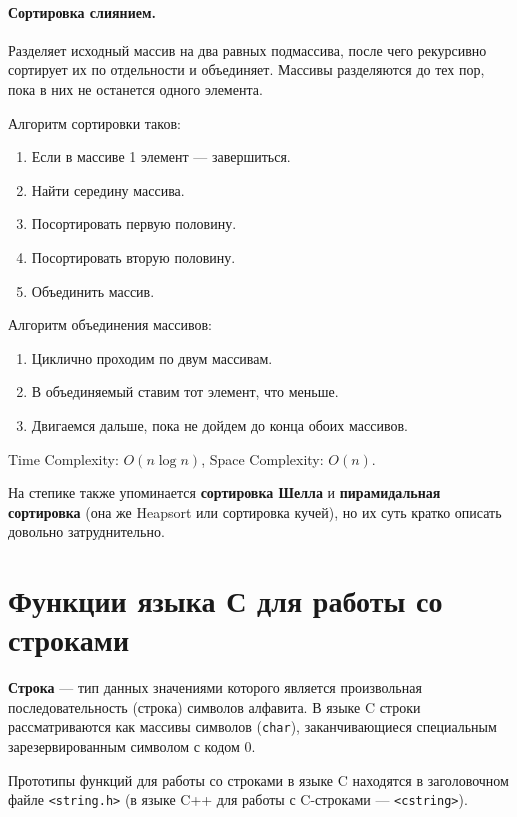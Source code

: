 \paragraph{Сортировка слиянием.}
Разделяет исходный массив на два равных подмассива, после чего рекурсивно сортирует их по отдельности и объединяет.
Массивы разделяются до тех пор, пока в них не останется одного элемента.

Алгоритм сортировки таков:
\begin{enumerate}
  \item Если в массиве 1 элемент --- завершиться.
  \item Найти середину массива.
  \item Посортировать первую половину.
  \item Посортировать вторую половину.
  \item Объединить массив.
\end{enumerate}

Алгоритм объединения массивов:
\begin{enumerate}
  \item Циклично проходим по двум массивам.
  \item В объединяемый ставим тот элемент, что меньше.
  \item Двигаемся дальше, пока не дойдем до конца обоих массивов.
\end{enumerate}

Time Complexity: $O(n\log n)$, Space Complexity: $O(n)$.

{\small На степике также упоминается \textbf{сортировка Шелла} и \textbf{пирамидальная сортировка}
(она же Heapsort или сортировка кучей), но их суть кратко описать довольно затруднительно.}

\section{Функции языка С для работы со строками}
\textbf{Строка} --- тип данных значениями которого является произвольная последовательность (строка)
символов алфавита.
В языке C строки рассматриваются как массивы символов (\verb|char|), заканчивающиеся
специальным зарезервированным символом с кодом 0.


Прототипы функций для работы со строками в языке C находятся в заголовочном файле \verb|<string.h>|
(в языке C++ для работы с C-строками --- \verb|<cstring>|).

